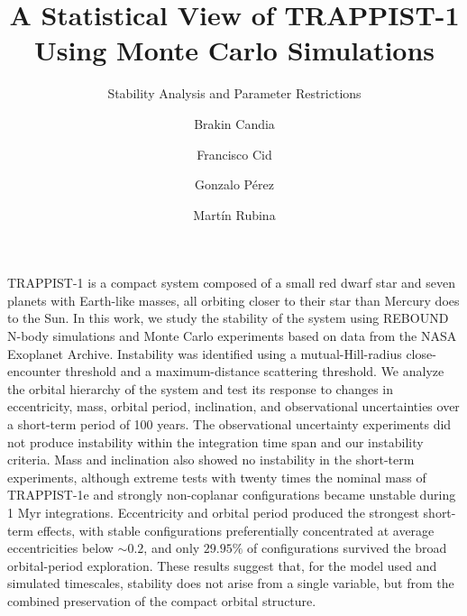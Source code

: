 \documentclass{aa}
\begin{document}
\makeatletter
\fancyhead[CO]{\aa@headfont\aa@titlerunning}
\makeatother

   \title{A Statistical View of TRAPPIST-1 Using Monte Carlo Simulations}

   \subtitle{Stability Analysis and Parameter Restrictions}

%

   \author{Brakin Candia%
        \and Francisco Cid%
        \and Gonzalo Pérez%
        \and Martín Rubina%
        }

   \institute{Departamento de Física, Universidad Técnica Federico Santa María, San Joaquín, Chile
   }


 
  \abstract
   {TRAPPIST-1 is a compact system composed of a small red dwarf star and seven planets with Earth-like masses, all orbiting closer to their star than Mercury does to the Sun. In this work, we study the stability of the system using REBOUND N-body simulations and Monte Carlo experiments based on data from the NASA Exoplanet Archive. Instability was identified using a mutual-Hill-radius close-encounter threshold and a maximum-distance scattering threshold. We analyze the orbital hierarchy of the system and test its response to changes in eccentricity, mass, orbital period, inclination, and observational uncertainties over a short-term period of 100 years. The observational uncertainty experiments did not produce instability within the integration time span and our instability criteria. Mass and inclination also showed no instability in the short-term experiments, although extreme tests with twenty times the nominal mass of TRAPPIST-1e and strongly non-coplanar configurations became unstable during 1 Myr integrations. Eccentricity and orbital period produced the strongest short-term effects, with stable configurations preferentially concentrated at average eccentricities below $\sim0.2$, and only $29.95\%$ of configurations survived the broad orbital-period exploration. These results suggest that, for the model used and simulated timescales, stability does not arise from a single variable, but from the combined preservation of the compact orbital structure.}
\end{document}
